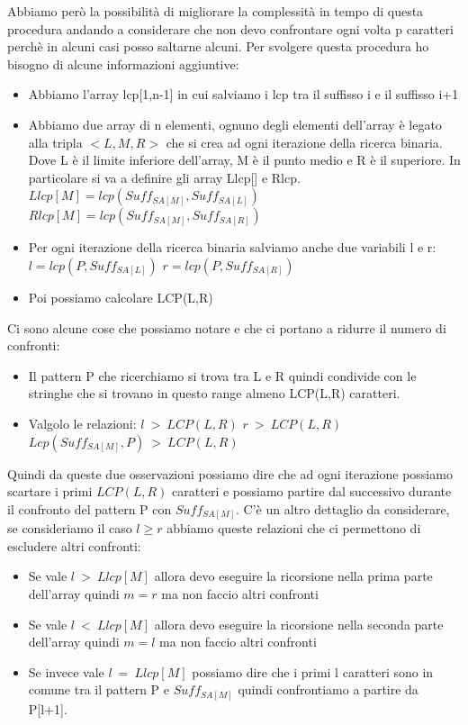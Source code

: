 \documentclass[14pt]{extreport}
\begin{document}
Abbiamo però la possibilità di migliorare la complessità in tempo di questa procedura andando a considerare che non devo confrontare ogni volta p caratteri perchè in alcuni casi posso saltarne alcuni. Per svolgere questa procedura ho bisogno di alcune informazioni aggiuntive:

\begin{itemize}
\item Abbiamo l'array lcp[1,n-1] in cui salviamo i lcp tra il suffisso i e il suffisso i+1
\item Abbiamo due array di n elementi, ognuno degli elementi dell'array è legato alla tripla $<L,M,R>$ che si crea ad ogni iterazione della ricerca binaria. Dove L è il limite inferiore dell'array, M è il punto medio e R è il superiore. In particolare si va a definire gli array Llcp[] e Rlcp.
$Llcp[M] = lcp(Suff_{SA[M]}, Suff_{SA[L]})$
$Rlcp[M] = lcp(Suff_{SA[M]}, Suff_{SA[R]})$
\item Per ogni iterazione della ricerca binaria salviamo anche due variabili l e r:
$l = lcp(P, Suff_{SA[L]})$
$r= lcp(P, Suff_{SA[R]})$
\item Poi possiamo calcolare LCP(L,R)
\end{itemize}

Ci sono alcune cose che possiamo notare e che ci portano a ridurre il numero di confronti:

\begin{itemize}
\item Il pattern P che ricerchiamo si trova tra L e R quindi condivide con le stringhe che si trovano in questo range almeno LCP(L,R) caratteri.
\item Valgolo le relazioni:
$l\ >\ LCP(L,R)$
$r\ >\ LCP(L,R)$
$Lcp(Suff_{SA[M]},P)\ >\ LCP(L,R)$
\end{itemize} 

Quindi da queste due osservazioni possiamo dire che ad ogni iterazione possiamo scartare i primi $LCP(L,R)$ caratteri e possiamo partire dal successivo durante il confronto del pattern P con $Suff_{SA[M]}$.
C'è un altro dettaglio da considerare, se consideriamo il caso $l \geq r$ abbiamo queste relazioni che ci permettono di escludere altri confronti:

\begin{itemize}
\item Se vale $l \ >\ Llcp[M]$ allora devo eseguire la ricorsione nella prima parte dell'array quindi $m = r$ ma non faccio altri confronti
\item Se vale $l \ <\ Llcp[M]$ allora devo eseguire la ricorsione nella seconda parte dell'array quindi $m = l$ ma non faccio altri confronti
\item Se invece vale $l \ =\ Llcp[M]$ possiamo dire che i primi l caratteri sono in comune tra il pattern P e $Suff_{SA[M]}$ quindi confrontiamo a partire da P[l+1].
\end{itemize}
\end{document}
